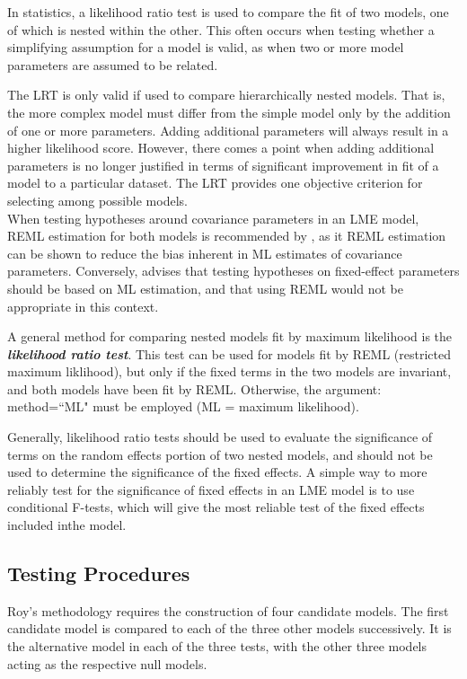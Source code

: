 \documentclass[12pt, a4paper]{article}
\begin{document}
In statistics, a likelihood ratio test is used to compare the fit of two models, one of which is nested within the other. This often occurs when testing whether a simplifying assumption for a model is valid, as when two or more model parameters are assumed to be related.
	
The LRT is only valid if used to compare hierarchically nested models. That is, the more complex model must differ from the simple model only by the addition of one or more parameters. Adding additional parameters will always result in a higher likelihood score. However, there comes a point when adding additional parameters is no longer justified in terms of significant improvement in fit of a model to a particular dataset. The LRT provides one objective criterion for selecting among possible models.\\
	
When testing hypotheses around covariance parameters in an LME model, REML estimation for both models is recommended by \citep{west}, as it REML estimation can be shown to reduce the bias inherent in ML estimates of covariance parameters. Conversely, \citet{PB} advises that testing hypotheses on fixed-effect parameters should be based on ML estimation, and that using REML would not be appropriate in this context.

\bigskip
	
A general method for comparing nested models fit by maximum likelihood is the \textbf{\emph{likelihood ratio test}}. This test can be used for models fit by REML (restricted maximum liklihood), but only if the fixed terms in the two models are invariant, and both models have been fit by REML. Otherwise, the argument: method=``ML" must be employed (ML = maximum likelihood).
	
Generally, likelihood ratio tests should be used to evaluate the significance of terms on the random effects portion of two nested models, and should not be used to determine the significance of the fixed effects. 	A simple way to more reliably test for the significance of fixed effects in an LME model is to use conditional F-tests, which will give the most reliable test of the fixed effects included inthe  model.
	

\subsection{Testing Procedures}
Roy's methodology requires the construction of four candidate models. The first candidate model is compared to each of the three other models successively. It is the alternative model in each of the three tests, with the other three models acting as the respective null models.
\end{document}
